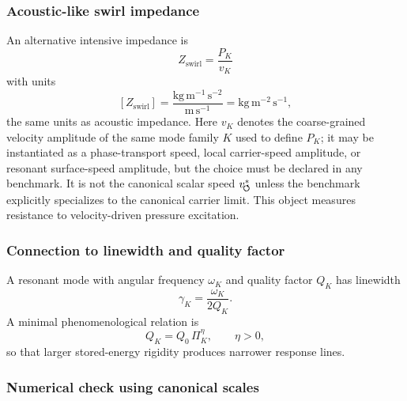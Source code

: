     \subsubsection*{Acoustic-like swirl impedance}
        
        An alternative intensive impedance is
        \begin{equation}
            \boxed{
                Z_{\mathrm{swirl}}
                =
                \frac{P_K}{v_K}
            }
            \label{eq:swirl_acoustic_impedance}
        \end{equation}
        with units
        \[
            [Z_{\mathrm{swirl}}]
            =
            \frac{\mathrm{kg\,m^{-1}\,s^{-2}}}{\mathrm{m\,s^{-1}}}
            =
            \mathrm{kg\,m^{-2}\,s^{-1}},
        \]
        the same units as acoustic impedance. Here $v_K$ denotes the coarse-grained velocity amplitude of the same mode family $K$ used to define $P_K$; it may be instantiated as a phase-transport speed, local carrier-speed amplitude, or resonant surface-speed amplitude, but the choice must be declared in any benchmark. It is not the canonical scalar speed $v_{\!\boldsymbol{\circlearrowleft}}^{\ast}$ unless the benchmark explicitly specializes to the canonical carrier limit. This object measures resistance to velocity-driven pressure excitation.
    
    \subsubsection*{Connection to linewidth and quality factor}
        
        A resonant mode with angular frequency \(\omega_K\) and quality factor \(Q_K\) has linewidth
        \begin{equation}
            \gamma_K
            =
            \frac{\omega_K}{2Q_K}.
            \label{eq:linewidth_quality_factor}
        \end{equation}
        A minimal phenomenological relation is
        \begin{equation}
            Q_K
            =
            Q_0\,\Pi_K^\eta,
            \qquad
            \eta>0,
            \label{eq:Q_rigidity_ansatz}
        \end{equation}
        so that larger stored-energy rigidity produces narrower response lines.
    
    \subsubsection*{Numerical check using canonical scales}
        
